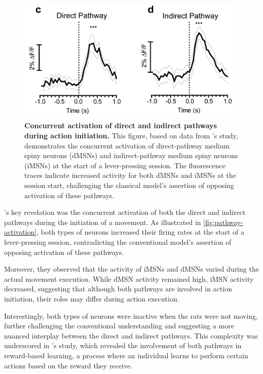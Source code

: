 \documentclass[10pt]{article}
\begin{document}
\begin{sloppypar}
  \begin{figure}[ht]
    \centering
    \includegraphics[width=\textwidth]{figures/direct-indirect-activation.png}
    \caption[Concurrent activation of direct and indirect pathways during action initiation]{\textbf{Concurrent activation of direct and indirect pathways during action initiation.} This figure, based on data from \cite{cui_concurrent_2013}’s study, demonstrates the concurrent activation of direct-pathway medium spiny neurons (dMSNs) and indirect-pathway medium spiny neurons (iMSNs) at the start of a lever-pressing session. The fluorescence traces indicate increased activity for both dMSNs and iMSNs at the session start, challenging the classical model’s assertion of opposing activation of these pathways.}
    \label{fig:pathway-activation}
  \end{figure}

  \citeauthor{cui_concurrent_2013}’s key revelation was the concurrent activation of both the direct and indirect pathways during the initiation of a movement. As illustrated in \autoref{fig:pathway-activation}, both types of neurons increased their firing rates at the start of a lever-pressing session, contradicting the conventional model’s assertion of opposing activation of these pathways.

  Moreover, they observed that the activity of iMSNs and dMSNs varied during the actual movement execution. While dMSN activity remained high, iMSN activity decreased, suggesting that although both pathways are involved in action initiation, their roles may differ during action execution.

  Interestingly, both types of neurons were inactive when the rats were not moving, further challenging the conventional understanding and suggesting a more nuanced interplay between the direct and indirect pathways. This complexity was underscored in \cite{guillaumin_experimental_2021}’s study, which revealed the involvement of both pathways in reward-based learning, a process where an individual learns to perform certain actions based on the reward they receive.


\end{sloppypar}
\end{document}
